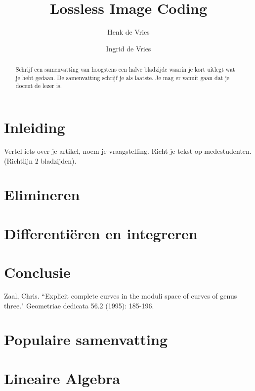 \documentclass[tweedejaarsproject]{uvamath}%
\title{Lossless Image Coding}
\author[henk@science.uva.nl, 6127901]{Henk de Vries}
\author[ingrid@science.uva.nl, 6123102]{Ingrid de Vries}
\begin{document}
\maketitle

\begin{abstract}
Schrijf een samenvatting van hoogstens een halve bladzijde waarin je kort uitlegt wat je hebt gedaan. De samenvatting schrijf je als laatste. Je mag er vanuit gaan dat je docent de lezer is.
\end{abstract}

\tableofcontents

\chapter{Inleiding}
Vertel iets over je artikel, noem je vraagstelling. Richt je tekst op medestudenten. (Richtlijn 2 bladzijden).

\chapter{Elimineren}
\lipsum[1-3]

\chapter{Differenti\"eren en integreren}
\lipsum[1-3]

\chapter{Conclusie}
\lipsum[1-3]

\clearpage%
\begin{thebibliography}{}
Zaal, Chris. ``Explicit complete curves in the moduli space of curves of genus three." Geometriae dedicata 56.2 (1995): 185-196.
\end{thebibliography}

\clearpage%
\chapter*{Populaire samenvatting}
\lipsum[1-2]

\appendix

\chapter{Lineaire Algebra}
\lipsum[1-3]
\end{document}
